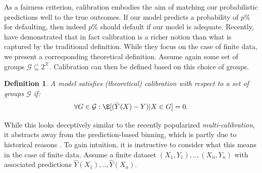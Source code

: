 \documentclass[11pt]{article} %
\makeatletter
\newcommand*{\ie}{i.e.\@\xspace}
\newtheorem{definition}[theorem]{Definition}
\makeatother
\begin{document}
As a fairness criterion, calibration embodies the aim of matching our probabilistic predictions well to the true outcomes. If our model predicts a probability of $p$\% for defaulting, then indeed $p$\% should default if our model is adequate. 
Recently, \citet{holtgen2023richness} have demonstrated that in fact calibration is a richer notion than what is captured by the traditional definition. While they focus on the case of finite data, we present a corresponding theoretical definition. Assume again some set of groups $\mathcal{G} \subseteq 2^{\mathcal{X}}$. Calibration can then be defined based on this choice of groups.
\begin{definition}
\label{def:calibrationtheo}
A model satisfies (theoretical) calibration with respect to a set of groups $\mathcal{G}$ if:
    \begin{displaymath}
\forall G \in \mathcal{G}: \E[(\hat{Y}(X)-Y)|X \in G]=0.
\end{displaymath}
\end{definition}
While this looks deceptively similar to the recently popularized \textit{multi-calibration}, it abstracts away from the prediction-based binning, which is partly due to historical reasons \citep{holtgen2023richness}.
To gain intuition, it is instructive to consider what this means in the case of finite data.
Assume a finite dataset $(X_1,Y_1),..,(X_n,Y_n)$ with associated predictions $\hat{Y}(X_1),..,\hat{Y}(X_n)$. 
\end{document}
